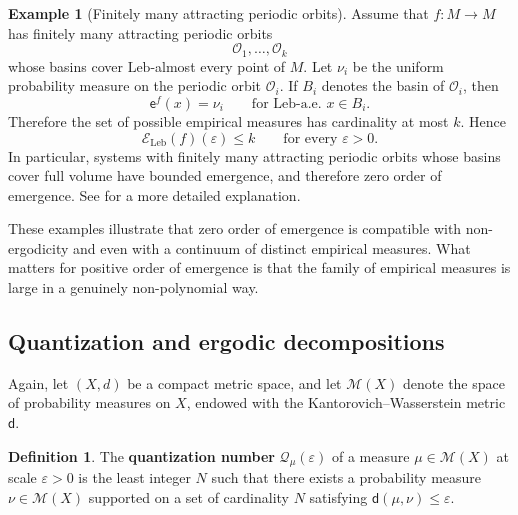 \documentclass[11pt,reqno]{amsart}
\theoremstyle{plain}
\theoremstyle{definition}
\newtheorem{definition}[theorem]{Definition}
\newtheorem{example}[theorem]{Example}
\theoremstyle{remark}
\theoremstyle{plain}
\numberwithin{equation}{section}
\newcommand{\eps}{\varepsilon}
\begin{document}
\begin{example}[Finitely many attracting periodic orbits]\label{ex:finite-sinks}
Assume that $f:M\to M$ has finitely many attracting periodic orbits
\begin{equation*}
\mathcal O_1,\dots,\mathcal O_k
\end{equation*}
whose basins cover $\mathrm{Leb}$-almost every point of $M$. Let $\nu_i$ be the
uniform probability measure on the periodic orbit $\mathcal O_i$. If $B_i$
denotes the basin of $\mathcal O_i$, then
\begin{equation*}
\mathsf e^f(x)=\nu_i
\qquad\text{for }\mathrm{Leb}\text{-a.e. }x\in B_i.
\end{equation*}
Therefore the set of possible empirical measures has cardinality at most $k$.
Hence
\begin{equation*}
\mathcal E_{\mathrm{Leb}}(f)(\varepsilon)\leq k
\qquad\text{for every }\varepsilon>0.
\end{equation*}
In particular, systems with finitely many attracting periodic orbits whose
basins cover full volume have bounded emergence, and therefore zero order of
emergence. See \cite{berger2017emergence} for a more detailed explanation.
\end{example}

These examples illustrate that zero order of emergence is compatible with
non-ergodicity and even with a continuum of distinct empirical measures. What
matters for positive order of emergence is that the family of empirical
measures is large in a genuinely non-polynomial way.

\subsection{Quantization and ergodic decompositions} \label{subsection: emergence and quantization}

Again, let $(X,d)$ be a compact metric space, and let $\mathcal{M}(X)$ denote the space of probability measures on $X$, endowed with the Kantorovich--Wasserstein metric $\mathsf{d}$.

\begin{definition}
	The \textbf{quantization number} $\mathcal{Q}_{\mu}(\eps)$ of a measure $\mu \in \mathcal{M}(X)$ at scale $\eps>0$ is the least integer $N$ such that there exists a probability measure $\nu\in \mathcal{M}(X)$ supported on a set of cardinality $N$ satisfying $\mathsf{d}(\mu,\nu)\leq \varepsilon$.
\end{definition}
\end{document}
